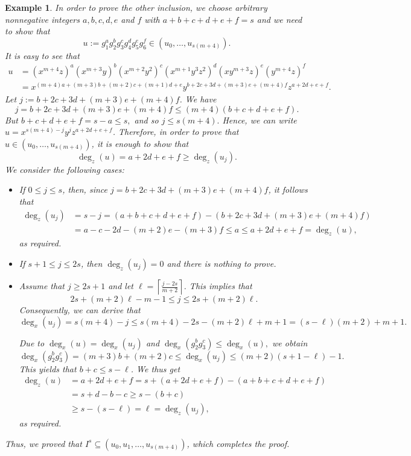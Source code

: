 \documentclass[11pt]{amsart}
\newtheorem{example}[theorem]{Example}
\begin{document}
\begin{example}
{In order to prove the other inclusion, 
we choose  arbitrary nonnegative integers $a,b,c,d,e$ and $f$ with $a+b+c+d+e+f=s$ and we  need to show that 
 $$u:=g_1^a g_2^b g_3^c g_4^d g_5^e g_6^f\in (u_0,\ldots,u_{s(m+4)}).$$
 It is easy to see that 
\begin{align*}
u&=(x^{m+4}z)^a(x^{m+3}y)^b(x^{m+2}y^2)^c(x^{m+1}y^3z^2)^d(xy^{m+3}z)^e(y^{m+4}z)^f\\
 &=x^{(m+4)a+(m+3)b+(m+2)c+(m+1)d+e}y^{b+2c+3d+(m+3)e+(m+4)f}z^{a+2d+e+f}.
\end{align*}
Let $j:=b+2c+3d+(m+3)e+(m+4)f$. We have
\[
j=b+2c+3d+(m+3)e+(m+4)f
\leq (m+4)(b+c+d+e+f).
\]
But $b+c+d+e+f=s-a\leq s,$ and so $j\leq s(m+4).$
Hence, we can write  $u=x^{s(m+4)-j}y^jz^{a+2d+e+f}$. 
 Therefore, in order to prove that $u\in (u_0,\ldots,u_{s(m+4)})$,
it is enough to show that $$\deg_z(u) = a+2d+e+f \geq \deg_z(u_j).$$
We consider the following  cases:
\begin{itemize}
\item If $0\leq j\leq s$, then, since $j=b+2c+3d+(m+3)e+(m+4)f$, it follows that %
      \begin{align*}
      \deg_z(u_j)&=s-j=(a+b+c+d+e+f)-(b+2c+3d+(m+3)e+(m+4)f)\\
      &=a-c-2d-(m+2)e-(m+3)f \leq a \leq a+2d+e+f = \deg_z(u),
      \end{align*}
        as required.
\item If $s+1\leq j\leq 2s$, then $\deg_z(u_j)=0$ and there is nothing to prove.
\item Assume that $j\geq 2s+1$ and let $\ell=\left\lceil \frac{j-2s}{m+2}\right\rceil$. This implies that 
      $$ 2s+(m+2)\ell-m-1 \leq j \leq 2s + (m+2)\ell.$$
      Consequently, we can derive that 	
	    $$\deg_x(u_j)=s(m+4)-j \leq s(m+4) - 2s -(m+2)\ell + m+1 = (s-\ell)(m+2)+m+1.$$
				
			Due to  $\deg_x(u)=\deg_x(u_j)$ and  $\deg_x(g_2^b g_3^c) \leq \deg_x(u),$  we obtain
			$$\deg_x(g_2^bg_3^c)=(m+3)b+(m+2)c \leq \deg_x(u_j) \leq (m+2)(s+1-\ell)-1.$$
		  This yields  that $b+c\leq s-\ell$. We thus get
		  \begin{align*}
			\deg_z(u)&=a+2d+e+f = s + (a+2d+e+f) - (a+b+c+d+e+f)  \\
		           &=s+d-b-c \geq s-(b+c) \\
		          & \geq s - (s-\ell)=\ell=\deg_z(u_j),
			\end{align*}
			as required.						
\end{itemize}
Thus, we proved  that   $ I^{s}  \subseteq    (u_0,u_1,\ldots,u_{s(m+4)})$,  which completes the proof. 

}
\end{example}
\end{document}
